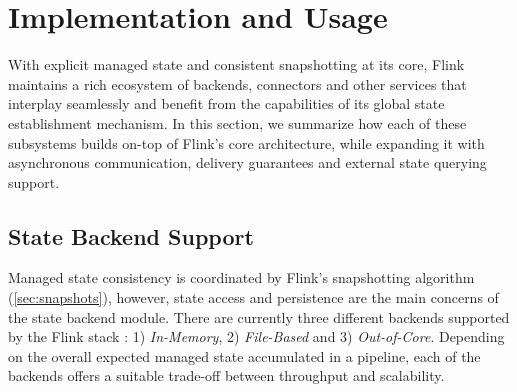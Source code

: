 

\section{Implementation and Usage}

With explicit managed state and consistent snapshotting at its core, Flink maintains a rich ecosystem of backends, connectors and other services that interplay seamlessly and benefit from the capabilities of its global state establishment mechanism. In this section, we summarize how each of these subsystems builds on-top of Flink's core architecture, while expanding it with asynchronous communication, delivery guarantees and external state querying support.

\label{sec:implementation}

\subsection{State Backend Support}

Managed state consistency is coordinated by Flink's snapshotting algorithm (\autoref{sec:snapshots}), however, state access and persistence are the main concerns of the state backend module. There are currently three different backends supported by the Flink stack : 1) \emph{In-Memory}, 2) \emph{File-Based} and 3) \emph{Out-of-Core}. Depending on the overall expected managed state accumulated in a pipeline, each of the backends offers a suitable trade-off between throughput and scalability.


